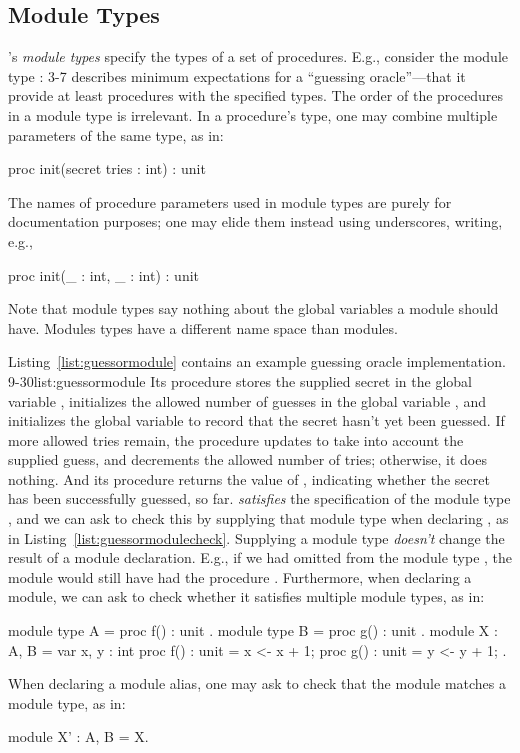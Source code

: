 \subsection{Module Types}

\EasyCrypt's \emph{module types} specify the types of a set of
procedures.  E.g., consider the module type  :
 {3-7}{}  describes
minimum expectations for a ``guessing oracle''---that it provide at
least procedures with the specified types.  The order of the
procedures in a module type is irrelevant. In a procedure's type, one
may combine multiple parameters of the same type, as in:
\begin{easycrypt}{}{}
proc init(secret tries : int) : unit
\end{easycrypt}
The names of procedure parameters used in module types
are purely for documentation purposes; one may elide them instead
using underscores, writing, e.g.,
\begin{easycrypt}{}{}
proc init(_ : int, _ : int) : unit
\end{easycrypt}
Note that module types say nothing about the global variables a module
should have. Modules types have a different name space than modules.

Listing~\ref{list:guessormodule} contains an example guessing oracle
implementation.   {9-30}{list:guessormodule} Its  procedure stores
the supplied secret in the global variable , initializes the
allowed number of guesses in the global variable , and
initializes the  global variable to record that the secret
hasn't yet been guessed.  If more allowed tries remain, the 
procedure updates  to take into account the supplied
guess, and decrements the allowed number of tries; otherwise, it does
nothing.  And its  procedure returns the value of
, indicating whether the secret has been successfully
guessed, so far.
 \emph{satisfies} the specification of the
module type , and we can ask \EasyCrypt to check this by
supplying that module type when declaring , as in
Listing~\ref{list:guessormodulecheck}.
Supplying a module type \emph{doesn't} change the result of a module
declaration. E.g., if we had omitted  from the module type
, the module  would still have had the procedure
. Furthermore, when declaring a module, we can ask
\EasyCrypt to check whether it satisfies multiple module types, as
in:
\begin{easycrypt}{}{}
module type A = { proc f() : unit }.
module type B = { proc g() : unit }.
module X : A, B = {
  var x, y : int
  proc f() : unit = { x <- x + 1; }
  proc g() : unit = { y <- y + 1; }
}.
\end{easycrypt}
When declaring a module alias, one may ask \EasyCrypt to check that
the module matches a module type, as in:
\begin{easycrypt}{}{}
module X' : A, B = X.
\end{easycrypt}

